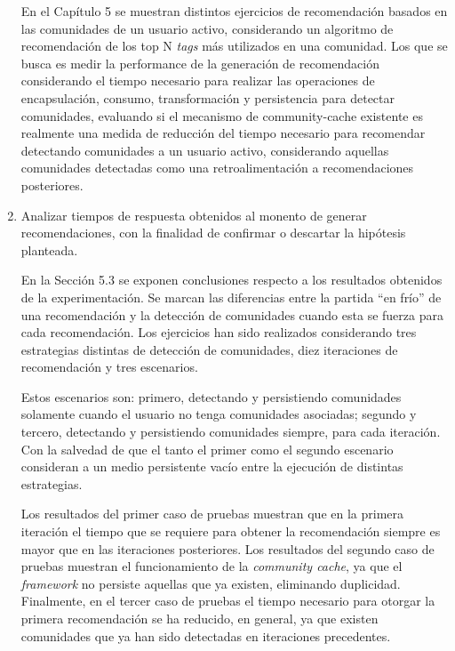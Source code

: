 \begin{enumerate}
  En el Capítulo 5 se muestran distintos ejercicios de recomendación basados en las comunidades de un usuario activo, considerando un algoritmo de recomendación de los top N \textit{tags} más utilizados en una comunidad. Los que se busca es medir la performance de la generación de recomendación considerando el tiempo necesario para realizar las operaciones de encapsulación, consumo, transformación y persistencia para detectar comunidades, evaluando si el mecanismo de community-cache existente es realmente una medida de reducción del tiempo necesario para recomendar detectando comunidades a un usuario activo, considerando aquellas comunidades detectadas como una retroalimentación a recomendaciones posteriores. \newline

  \item Analizar tiempos de respuesta obtenidos al monento de generar recomendaciones, con la finalidad de confirmar o descartar la hipótesis planteada. \newline

  En la Sección 5.3 se exponen conclusiones respecto a los resultados obtenidos de la experimentación. Se marcan las diferencias entre la partida “en frío” de una recomendación y la detección de comunidades cuando esta se fuerza para cada recomendación. Los ejercicios han sido realizados considerando tres estrategias distintas de detección de comunidades, diez iteraciones de recomendación y tres escenarios. \newline

  Estos escenarios son: primero, detectando y persistiendo comunidades solamente cuando el usuario no tenga comunidades asociadas; segundo y tercero, detectando y persistiendo comunidades siempre, para cada iteración. Con la salvedad de que el tanto el primer como el segundo escenario consideran a un medio persistente vacío entre la ejecución de distintas estrategias. \newline

  Los resultados del primer caso de pruebas muestran que en la primera iteración el tiempo que se requiere para obtener la recomendación siempre es mayor que en las iteraciones posteriores. Los resultados del segundo caso de pruebas muestran el funcionamiento de la \textit{community cache}, ya que el \textit{framework} no persiste aquellas que ya existen, eliminando duplicidad. Finalmente, en el tercer caso de pruebas el tiempo necesario para otorgar la primera recomendación se ha reducido, en general, ya que existen comunidades que ya han sido detectadas en iteraciones precedentes. \newline


\end{enumerate}
